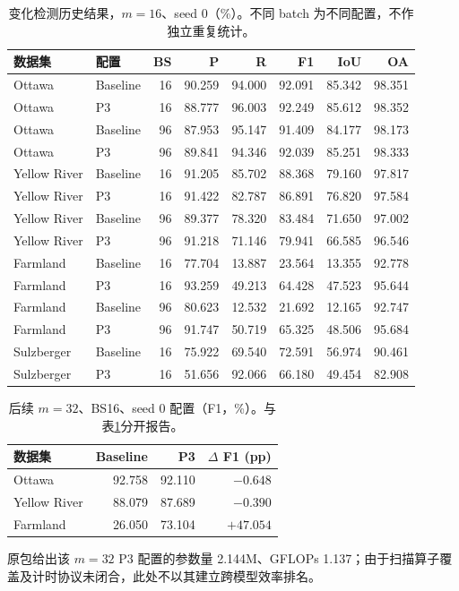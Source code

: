 \documentclass[UTF8,11pt,a4paper,fontset=fandol]{ctexart}
\begin{document}
\begin{table}[H]\centering\small
\caption{变化检测历史结果，$m=16$、seed 0（\%）。不同 batch 为不同配置，不作独立重复统计。}
\label{tab:cd16}
\setlength{\tabcolsep}{4pt}
\begin{tabular}{llrrrrrr}
\toprule
数据集 & 配置 & BS & P & R & F1 & IoU & OA\\
\midrule
Ottawa & Baseline & 16 & 90.259 & 94.000 & 92.091 & 85.342 & 98.351\\
Ottawa & P3 & 16 & 88.777 & 96.003 & 92.249 & 85.612 & 98.352\\
Ottawa & Baseline & 96 & 87.953 & 95.147 & 91.409 & 84.177 & 98.173\\
Ottawa & P3 & 96 & 89.841 & 94.346 & 92.039 & 85.251 & 98.333\\
Yellow River & Baseline & 16 & 91.205 & 85.702 & 88.368 & 79.160 & 97.817\\
Yellow River & P3 & 16 & 91.422 & 82.787 & 86.891 & 76.820 & 97.584\\
Yellow River & Baseline & 96 & 89.377 & 78.320 & 83.484 & 71.650 & 97.002\\
Yellow River & P3 & 96 & 91.218 & 71.146 & 79.941 & 66.585 & 96.546\\
Farmland & Baseline & 16 & 77.704 & 13.887 & 23.564 & 13.355 & 92.778\\
Farmland & P3 & 16 & 93.259 & 49.213 & 64.428 & 47.523 & 95.644\\
Farmland & Baseline & 96 & 80.623 & 12.532 & 21.692 & 12.165 & 92.747\\
Farmland & P3 & 96 & 91.747 & 50.719 & 65.325 & 48.506 & 95.684\\
Sulzberger & Baseline & 16 & 75.922 & 69.540 & 72.591 & 56.974 & 90.461\\
Sulzberger & P3 & 16 & 51.656 & 92.066 & 66.180 & 49.454 & 82.908\\
\bottomrule
\end{tabular}
\end{table}

\begin{table}[H]\centering\small
\caption{后续 $m=32$、BS16、seed 0 配置（F1，\%）。与表\ref{tab:cd16}分开报告。}
\label{tab:cd32}
\begin{tabular}{lrrr}
\toprule
数据集 & Baseline & P3 & $\Delta$ F1 (pp)\\
\midrule
Ottawa & 92.758 & 92.110 & $-0.648$\\
Yellow River & 88.079 & 87.689 & $-0.390$\\
Farmland & 26.050 & 73.104 & $+47.054$\\
\bottomrule
\end{tabular}
\end{table}
原包给出该 $m=32$ P3 配置的参数量 2.144M、GFLOPs 1.137；由于扫描算子覆盖及计时协议未闭合，此处不以其建立跨模型效率排名。
\end{document}
